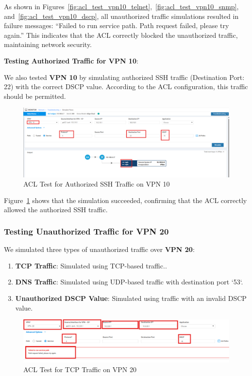 \documentclass[12pt,english]{report}
\begin{document}
As shown in Figures~\ref{fig:acl_test_vpn10_telnet},~\ref{fig:acl_test_vpn10_snmp}, and~\ref{fig:acl_test_vpn10_dscp}, all unauthorized traffic simulations resulted in failure messages: “Failed to run service path. Path request failed, please try again.” This indicates that the ACL correctly blocked the unauthorized traffic, maintaining network security.

\textbf{Testing Authorized Traffic for VPN 10}:

We also tested \textbf{VPN 10} by simulating authorized SSH traffic (Destination Port: 22) with the correct DSCP value. According to the ACL configuration, this traffic should be permitted.

\begin{figure}[H]
    \centering
    \includegraphics[width=1\textwidth]{chapter 4/jdid/vpn10_correct.png}
    \caption{ACL Test for Authorized SSH Traffic on VPN 10}
    \label{fig:acl_test_vpn10_ssh}
\end{figure}

Figure~\ref{fig:acl_test_vpn10_ssh} shows that the simulation succeeded, confirming that the ACL correctly allowed the authorized SSH traffic.

\subsubsection{Testing Unauthorized Traffic for VPN 20}

We simulated three types of unauthorized traffic over \textbf{VPN 20}:
\begin{enumerate}
    \item \textbf{TCP Traffic}: Simulated using TCP-based traffic..
    \item \textbf{DNS Traffic}: Simulated using UDP-based traffic with destination port `53`.
    \item \textbf{Unauthorized DSCP Value}: Simulated using traffic with an invalid DSCP value.
\end{enumerate}

\begin{figure}[H]
    \centering
    \includegraphics[width=1\textwidth]{chapter 4/jdid/vpn20_tcp.png}
    \caption{ACL Test for TCP Traffic on VPN 20}
    \label{fig:acl_test_vpn20_tcp}
\end{figure}
\end{document}
